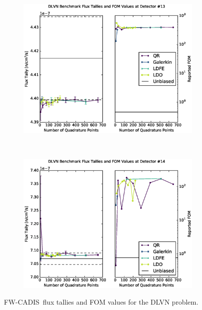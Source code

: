 \documentclass{article} %
\newcommand{\fwc}{\mbox{FW-CADIS}}
\begin{document}
\clearpage
\begin{figure}[!htb]
\ContinuedFloat
\begin{subfigure}{\linewidth}
\centering
\includegraphics[max height=0.445\textheight]
{img/dlvn-fwcadis-13.eps}
\label{dlvn-fwc-13}
\end{subfigure} 
\\
\begin{subfigure}{\linewidth}
\centering
\includegraphics[max height=0.445\textheight]
{img/dlvn-fwcadis-14.eps}
\label{dlvn-fwc-14}
\end{subfigure}
\caption{\fwc\ flux tallies and FOM values for the DLVN problem.}
\label{dlvn-fwc-tally}
\end{figure}
\end{document}
